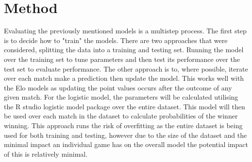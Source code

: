 \documentclass[12pt,a4paper]{article}
\begin{document}
\section{Method}
Evaluating the previously mentioned models is a multistep process. The first
step is to decide how to "train" the models. There are two approaches that were
considered, splitting the data into a training and testing set. Running the
model over the training set to tune parameters and then test its performance over
the test set to evaluate performance.
The other approach is to, where possible, iterate over each match make a
prediction then update the model. This works well with the Elo models as
updating the point values occurs after the outcome of any given match. For
the logistic model, the parameters will be calculated utilising the R studio
logistic model package over the entire dataset. This model will then be used over each
match in the dataset to calculate probabilities of the winner winning. This
approach runs the risk of overfitting as the entire dataset is being used for
both training and testing, however due to the size of the dataset and the minimal
impact an individual game has on the overall model the potential impact of this is
relatively minimal.
\end{document}
